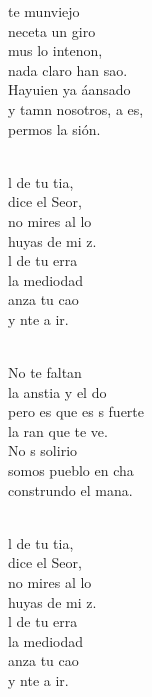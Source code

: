 \begin{cancion}%
	te munviejo\\
	neceta un giro \\
	mus lo intenon,\\
	nada claro han sao.\\
	Hayuien ya áansado\\
	y tamn nosotros, a es, \\
	permos la sión.\\\jump\\
	\begin{chorus}%
	l de tu tia,\\
	 dice el Seor,\\
	no mires al lo\\
	 huyas de mi z.\\
	l de tu erra\\
	la mediodad\\
	anza tu cao\\
	y nte a ir.\\
	\end{chorus}%
	\jump\\
	No te faltan\\
	la anstia y el do\\
	pero es que es s fuerte\\
	la ran que te ve.\\
	No s solirio\\
	somos pueblo en cha\\
	construndo el mana.\\\jump\\
	\begin{chorus}%
	l de tu tia,\\
	 dice el Seor,\\
	no mires al lo\\
	 huyas de mi z.\\
	l de tu erra\\
	la mediodad\\
	anza tu cao\\
	y nte a ir.\\
	\end{chorus}%
	\jump\\
\end{cancion}%
